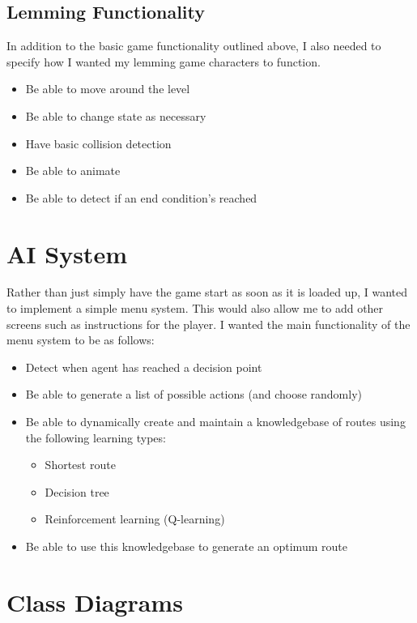 \documentclass[a4paper,oneside]{report}
\begin{document}
\subsection{Lemming Functionality}

In addition to the basic game functionality outlined above, I also needed to specify how I wanted my lemming game characters to function. 

\begin{itemize}
	\item Be able to move around the level
	\item Be able to change state as necessary
	\item Have basic collision detection
	\item Be able to animate
	\item Be able to detect if an end condition's reached
\end{itemize}

\section{AI System}

Rather than just simply have the game start as soon as it is loaded up, I wanted to implement a simple menu system. This would also allow me to add other screens such as instructions for the player. I wanted the main functionality of the menu system to be as follows:

\begin{itemize}
	\item Detect when agent has reached a decision point
	\item Be able to generate a list of possible actions (and choose randomly)
	\item Be able to dynamically create and maintain a knowledgebase of routes using the following learning types:
	\begin{itemize}
		\item Shortest route
		\item Decision tree
		\item Reinforcement learning (Q-learning)
	\end{itemize}
	\item Be able to use this knowledgebase to generate an optimum route
\end{itemize}

\section{Class Diagrams}
\end{document}
